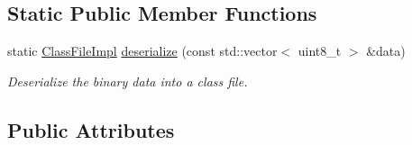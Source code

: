 \subsection*{Static Public Member Functions}
\begin{DoxyCompactItemize}
\item 
static \hyperlink{classClassFileImpl}{Class\+File\+Impl} \hyperlink{classClassFileImpl_abdfa46cef80b0ec30115f1c0c9bb1db6}{deserialize} (const std\+::vector$<$ uint8\+\_\+t $>$ \&data)
\begin{DoxyCompactList}\small\item\em Deserialize the binary data into a class file. \end{DoxyCompactList}\end{DoxyCompactItemize}
\subsection*{Public Attributes}
